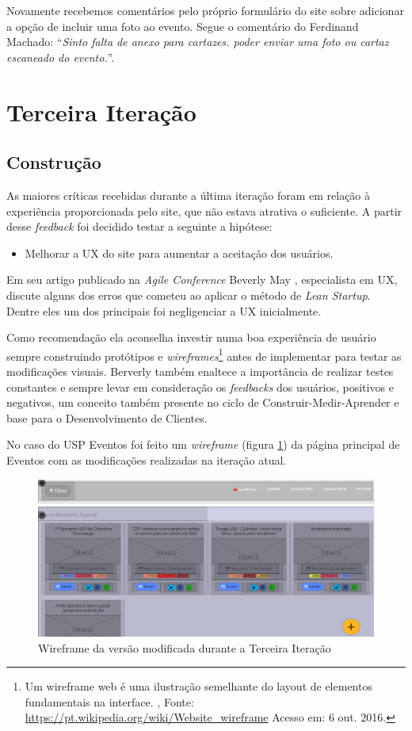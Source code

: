 \par Novamente recebemos comentários pelo próprio formulário do site sobre adicionar a opção de incluir uma foto ao evento. Segue o comentário do Ferdinand Machado: ``\emph{Sinto falta de anexo para cartazes. poder enviar uma foto ou cartaz escaneado do evento.}''.

\section{Terceira Iteração}
\subsection{Construção}
	\par As maiores críticas recebidas durante a última iteração foram em relação à experiência proporcionada pelo site, que não estava atrativa o suficiente. A partir desse \emph{feedback} foi decidido testar a seguinte a hipótese:
	\begin{itemize}
	\item Melhorar a UX do site para aumentar a aceitação dos usuários.
	\end{itemize}
	\par Em seu artigo publicado na \emph{Agile Conference} Beverly May \citep{beverly:2012}, especialista em UX, discute alguns dos erros que cometeu ao aplicar o método de \emph{Lean Startup}. Dentre eles um dos principais foi negligenciar a UX inicialmente. 
	\par Como recomendação ela aconselha investir numa boa experiência de usuário sempre construindo protótipos e \emph{wireframes}\footnote{ Um wireframe web é uma ilustração semelhante do layout de elementos fundamentais na interface. , Fonte: \url{https://pt.wikipedia.org/wiki/Website_wireframe} Acesso em: 6 out. 2016.} antes de implementar para testar as modificações visuais. Berverly também enaltece a importância de realizar testes constantes e sempre levar em consideração os \emph{feedbacks} dos usuários, positivos e negativos, um conceito também presente no ciclo de Construir-Medir-Aprender e base para o Desenvolvimento de Clientes.
	\par No caso do USP Eventos foi feito um \emph{wireframe} (figura \ref{fig:wireframe}) da página principal de Eventos com as modificações realizadas na iteração atual.
\begin{figure}[htb]
\centering
\includegraphics[width=15cm]{figuras/wireframe}
\caption{\label{fig:wireframe} Wireframe da versão modificada durante a Terceira Iteração}
\end{figure}
